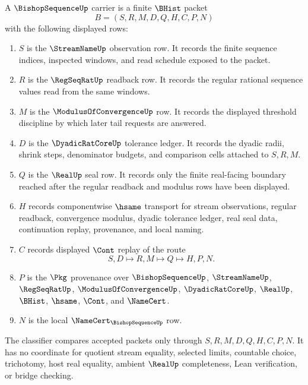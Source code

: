 \begin{definition}
\label{def:bishop-sequence-carrier}
A $\BishopSequenceUp$ carrier is a finite $\BHist$ packet
$$
B=(S,R,M,D,Q,H,C,P,N)
$$
with the following displayed rows:
\begin{enumerate}
\item $S$ is the $\StreamNameUp$ observation row. It records the finite sequence indices, inspected windows, and read schedule exposed to the packet.
\item $R$ is the $\RegSeqRatUp$ readback row. It records the regular rational sequence values read from the same windows.
\item $M$ is the $\ModulusOfConvergenceUp$ row. It records the displayed threshold discipline by which later tail requests are answered.
\item $D$ is the $\DyadicRatCoreUp$ tolerance ledger. It records the dyadic radii, shrink steps, denominator budgets, and comparison cells attached to $S,R,M$.
\item $Q$ is the $\RealUp$ seal row. It records only the finite real-facing boundary reached after the regular readback and modulus rows have been displayed.
\item $H$ records componentwise $\hsame$ transport for stream observations, regular readback, convergence modulus, dyadic tolerance ledger, real seal data, continuation replay, provenance, and local naming.
\item $C$ records displayed $\Cont$ replay of the route
$$
S,D \longmapsto R,M \longmapsto Q \longmapsto H,P,N .
$$
\item $P$ is the $\Pkg$ provenance over $\BishopSequenceUp$, $\StreamNameUp$, $\RegSeqRatUp$, $\ModulusOfConvergenceUp$, $\DyadicRatCoreUp$, $\RealUp$, $\BHist$, $\hsame$, $\Cont$, and $\NameCert$.
\item $N$ is the local $\NameCert_{\BishopSequenceUp}$ row.
\end{enumerate}
The classifier compares accepted packets only through $S,R,M,D,Q,H,C,P,N$. It has no coordinate for quotient stream equality, selected limits, countable choice, trichotomy, host real equality, ambient $\RealUp$ completeness, Lean verification, or bridge checking.
\end{definition}

